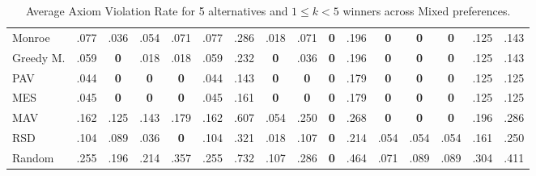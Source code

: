 \begin{table}[tbp]
\begin{tabular}{lccccccccccccccc}
Monroe & .077 & .036 & .054 & .071 & .077 & .286 & .018 & .071 & \cellcolor{green!25}\textbf{0} & .196 & \cellcolor{green!25}\textbf{0} & \textbf{0} & \textbf{0} & .125 & .143 \\
Greedy M. & .059 & \textbf{0} & .018 & .018 & .059 & .232 & \textbf{0} & .036 & \cellcolor{green!25}\textbf{0} & .196 & \cellcolor{green!25}\textbf{0} & \textbf{0} & \textbf{0} & .125 & .143 \\
PAV & .044 & \textbf{0} & \textbf{0} & \cellcolor{green!25}\textbf{0} & .044 & .143 & \textbf{0} & \textbf{0} & \textbf{0} & .179 & \cellcolor{green!25}\textbf{0} & \cellcolor{green!25}\textbf{0} & \textbf{0} & .125 & .125 \\
MES & .045 & \textbf{0} & \textbf{0} & \textbf{0} & .045 & .161 & \textbf{0} & \textbf{0} & \textbf{0} & .179 & \cellcolor{green!25}\textbf{0} & \cellcolor{green!25}\textbf{0} & \textbf{0} & .125 & .125 \\
MAV & .162 & .125 & .143 & .179 & .162 & .607 & .054 & .250 & \textbf{0} & .268 & \textbf{0} & \textbf{0} & \textbf{0} & .196 & .286 \\
RSD & .104 & .089 & .036 & \textbf{0} & .104 & .321 & .018 & .107 & \textbf{0} & .214 & .054 & .054 & .054 & .161 & .250 \\
Random & .255 & .196 & .214 & .357 & .255 & .732 & .107 & .286 & \textbf{0} & .464 & .071 & .089 & .089 & .304 & .411 \\
\bottomrule
\end{tabular}
\caption{Average Axiom Violation Rate for 5 alternatives and $1 \leq k < 5$ winners across Mixed preferences.}
\end{table}
